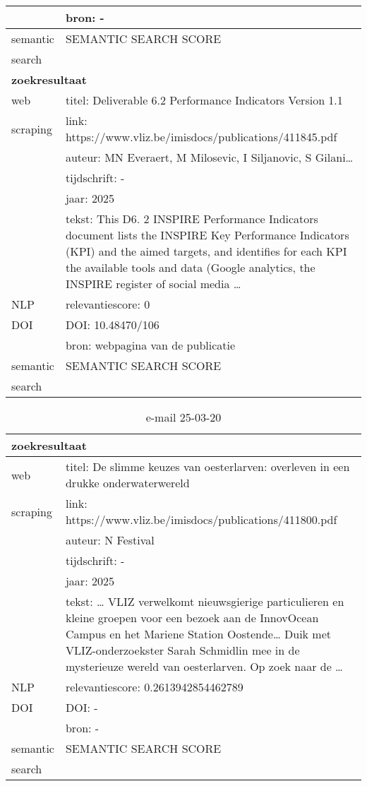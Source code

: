 \begin{table}[h!]
\begin{tabularx}{\textwidth}{|p{4cm}|X|}
        &bron: -\\
        \hline
        semantic&SEMANTIC SEARCH SCORE\\
        search&\\
        \hline
        \multicolumn{2}{|X|}{\textbf{zoekresultaat}} \\
        \hline
        web &titel: Deliverable 6.2 Performance Indicators Version 1.1\\
        scraping&link: https://www.vliz.be/imisdocs/publications/411845.pdf\\
        &auteur: MN Everaert, M Milosevic, I Siljanovic, S Gilani…\\
        &tijdschrift: -\\
        &jaar: 2025\\
        &tekst: This D6. 2 INSPIRE Performance Indicators document lists the INSPIRE Key Performance Indicators (KPI) and the aimed targets, and identifies for each KPI the available tools and data (Google analytics, the INSPIRE register of social media …\\
        \hline
        NLP&relevantiescore: 0\\
        \hline
        DOI&DOI: 10.48470/106\\
        &bron: webpagina van de publicatie\\
        \hline
        semantic&SEMANTIC SEARCH SCORE\\
        search&\\
        \hline
    \end{tabularx}
    \label{table:email20250317}
\end{table}
\begin{table}[h!]
    \caption{e-mail 25-03-20}
    \centering
    \begin{tabularx}{\textwidth}{|p{4cm}|X|} 
        \hline
        \multicolumn{2}{|X|}{\textbf{zoekresultaat}} \\
        \hline
        web &titel: De slimme keuzes van oesterlarven: overleven in een drukke onderwaterwereld\\
        scraping&link: https://www.vliz.be/imisdocs/publications/411800.pdf\\
        &auteur: N Festival\\
        &tijdschrift: -\\
        &jaar: 2025\\
        &tekst: … VLIZ verwelkomt nieuwsgierige particulieren en kleine groepen voor een bezoek aan de InnovOcean Campus en het Mariene Station Oostende… Duik met VLIZ-onderzoekster Sarah Schmidlin mee in de mysterieuze wereld van oesterlarven. Op zoek naar de …\\
        \hline
        NLP&relevantiescore: 0.2613942854462789\\
        \hline
        DOI&DOI: -\\
        &bron: -\\
        \hline
        semantic&SEMANTIC SEARCH SCORE\\
        search&\\
        \hline
    \end{tabularx}
    \label{table:email20250320}
\end{table}
